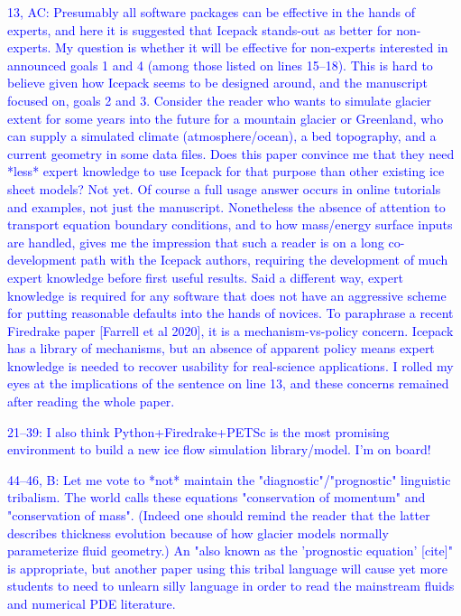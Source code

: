 \documentclass{article}
\theoremstyle{definition}
\theoremstyle{plain}
\begin{document}
\textcolor{blue}{13, AC:  Presumably all software packages can be effective in the hands of experts, and here it is suggested that Icepack stands-out as better for non-experts.  My question is whether it will be effective for non-experts interested in announced goals 1 and 4 (among those listed on lines 15--18).  This is hard to believe given how Icepack seems to be designed around, and the manuscript focused on, goals 2 and 3.  Consider the reader who wants to simulate glacier extent for some years into the future for a mountain glacier or Greenland, who can supply a simulated climate (atmosphere/ocean), a bed topography, and a current geometry in some data files.  Does this paper convince me that they need *less* expert knowledge to use Icepack for that purpose than other existing ice sheet models?  Not yet.  Of course a full usage answer occurs in online tutorials and examples, not just the manuscript.  Nonetheless the absence of attention to transport equation boundary conditions, and to how mass/energy surface inputs are handled, gives me the impression that such a reader is on a long co-development path with the Icepack authors, requiring the development of much expert knowledge before first useful results.  Said a different way, expert knowledge is required for any software that does not have an aggressive scheme for putting reasonable defaults into the hands of novices.  To paraphrase a recent Firedrake paper [Farrell et al 2020], it is a mechanism-vs-policy concern.  Icepack has a library of mechanisms, but an absence of apparent policy means expert knowledge is needed to recover usability for real-science applications.  I rolled my eyes at the implications of the sentence on line 13, and these concerns remained after reading the whole paper.}

\textcolor{blue}{21--39:  I also think Python+Firedrake+PETSc is the most promising environment to build a new ice flow simulation library/model.  I'm on board!}

\textcolor{blue}{44--46, B:  Let me vote to *not* maintain the "diagnostic"/"prognostic" linguistic tribalism.  The world calls these equations "conservation of momentum" and "conservation of mass".  (Indeed one should remind the reader that the latter describes thickness evolution because of how glacier models normally parameterize fluid geometry.)  An "also known as the 'prognostic equation' [cite]" is appropriate, but another paper using this tribal language will cause yet more students to need to unlearn silly language in order to read the mainstream fluids and numerical PDE literature.}
\end{document}
